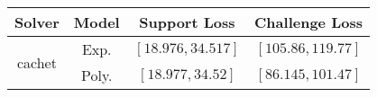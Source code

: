 \begin{tabular}{cc|c|c} 
\hline 
 Solver & Model & Support Loss  & Challenge Loss \tabularnewline\hline 
\hline 
\multirow{2}{*}{cachet} & Exp. & $\left[18.976,34.517\right]$ & $\left[105.86,119.77\right]$ \tabularnewline 
 & Poly. & $\mathbf{\left[18.977,34.52\right]}$ & $\mathbf{\left[86.145,101.47\right]}$ \tabularnewline 
\hline 
\end{tabular} 

